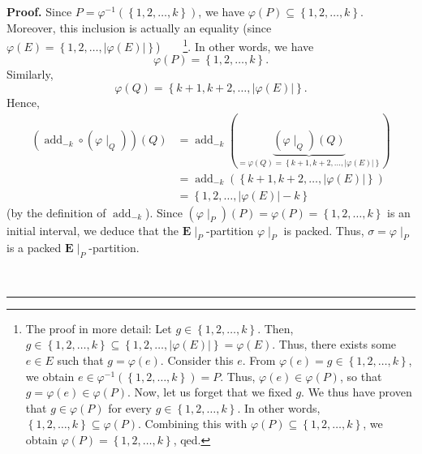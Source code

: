 \documentclass[numbers=enddot,12pt,final,onecolumn,notitlepage,abstracton]{scrartcl}
\theoremstyle{definition}
\newenvironment{proof}[1][Proof]{\noindent\textbf{#1.} }{\ \rule{0.5em}{0.5em}}
\newenvironment{verlong}{}{}
\newcommand{\EE}{{\mathbf{E}}}
\begin{document}
\begin{verlong}
\begin{proof}
Since $P=\varphi^{-1}\left(  \left\{  1,2,\ldots,k\right\}  \right)  $, we
have $\varphi\left(  P\right)  \subseteq\left\{  1,2,\ldots,k\right\}  $.
Moreover, this inclusion is actually an equality (since $\varphi\left(
E\right)  =\left\{  1,2,\ldots,\left\vert \varphi\left(  E\right)  \right\vert
\right\}  $)\ \ \ \ \footnote{The proof in more detail: Let $g\in\left\{
1,2,\ldots,k\right\}  $. Then, $g\in\left\{  1,2,\ldots,k\right\}
\subseteq\left\{  1,2,\ldots,\left\vert \varphi\left(  E\right)  \right\vert
\right\}  =\varphi\left(  E\right)  $. Thus, there exists some $e\in E$ such
that $g=\varphi\left(  e\right)  $. Consider this $e$. From $\varphi\left(
e\right)  =g\in\left\{  1,2,\ldots,k\right\}  $, we obtain $e\in\varphi
^{-1}\left(  \left\{  1,2,\ldots,k\right\}  \right)  =P$. Thus, $\varphi
\left(  e\right)  \in\varphi\left(  P\right)  $, so that $g=\varphi\left(
e\right)  \in\varphi\left(  P\right)  $. Now, let us forget that we fixed $g$.
We thus have proven that $g\in\varphi\left(  P\right)  $ for every
$g\in\left\{  1,2,\ldots,k\right\}  $. In other words, $\left\{
1,2,\ldots,k\right\}  \subseteq\varphi\left(  P\right)  $. Combining this with
$\varphi\left(  P\right)  \subseteq\left\{  1,2,\ldots,k\right\}  $, we obtain
$\varphi\left(  P\right)  =\left\{  1,2,\ldots,k\right\}  $, qed.}. In other
words, we have
\begin{equation}
\varphi\left(  P\right)  =\left\{  1,2,\ldots,k\right\}  .
\label{pf.lem.Gammaw.coprod.bij.a.3}
\end{equation}
Similarly,
\begin{equation}
\varphi\left(  Q\right)  =\left\{  k+1,k+2,\ldots,\left\vert \varphi\left(
E\right)  \right\vert \right\}  .
\label{pf.lem.Gammaw.coprod.bij.a.4}
\end{equation}
Hence,
\begin{align*}
\left(  \operatorname{add}_{-k}\circ\left(  \varphi\mid_{Q}\right)
\right)  \left(  Q\right)   &  =\operatorname{add}_{-k}\left(
\underbrace{\left(  \varphi\mid_{Q}\right)  \left(  Q\right)  }_{=\varphi
\left(  Q\right)  =\left\{  k+1,k+2,\ldots,\left\vert \varphi\left(  E\right)
\right\vert \right\}  }\right) \\
&=  \operatorname{add}_{-k}\left(
\left\{  k+1,k+2,\ldots,\left\vert \varphi\left(  E\right)  \right\vert
\right\}  \right) \\
&  =\left\{  1,2,\ldots,\left\vert \varphi\left(  E\right)  \right\vert
-k\right\}
\end{align*}
(by the definition of $\operatorname{add}_{-k}$). Since $\left(
\varphi\mid_{P}\right)  \left(  P\right)  =\varphi\left(  P\right)  =\left\{
1,2,\ldots,k\right\}  $ is an initial interval, we deduce that the
$\EE\mid_{P}$-partition $\varphi\mid_{P}$ is packed. Thus,
$\sigma=\varphi\mid_{P}$ is a packed $\EE\mid_{P}$-partition.


\end{proof}
\end{verlong}
\end{document}
